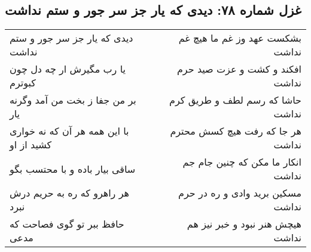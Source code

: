 \begin{center}
\section*{غزل شماره ۷۸: دیدی که یار جز سر جور و ستم نداشت}
\label{sec:sh078}
\begin{longtable}{l p{0.5cm} r}
دیدی که یار جز سر جور و ستم نداشت
&&
بشکست عهد وز غم ما هیچ غم نداشت
\\
یا رب مگیرش ار چه دل چون کبوترم
&&
افکند و کشت و عزت صید حرم نداشت
\\
بر من جفا ز بخت من آمد وگرنه یار
&&
حاشا که رسم لطف و طریق کرم نداشت
\\
با این همه هر آن که نه خواری کشید از او
&&
هر جا که رفت هیچ کسش محترم نداشت
\\
ساقی بیار باده و با محتسب بگو
&&
انکار ما مکن که چنین جام جم نداشت
\\
هر راهرو که ره به حریم درش نبرد
&&
مسکین برید وادی و ره در حرم نداشت
\\
حافظ ببر تو گوی فصاحت که مدعی
&&
هیچش هنر نبود و خبر نیز هم نداشت
\\
\end{longtable}
\end{center}
